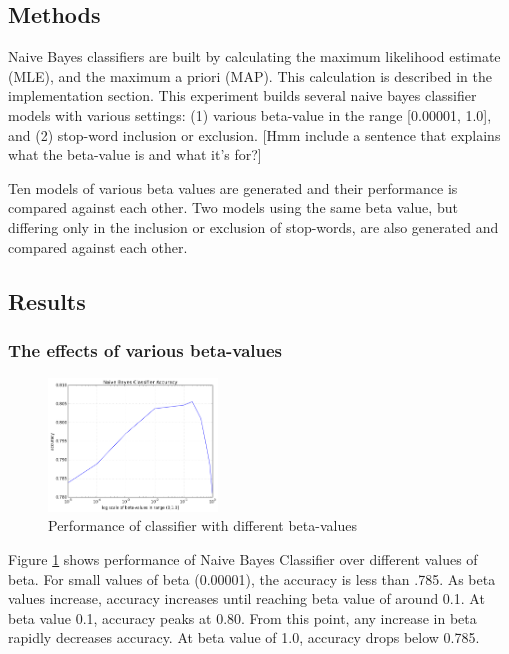 \documentclass{IEEEtran}
\begin{document}
\subsection{Methods}
Naive Bayes classifiers are built by calculating the maximum likelihood estimate (MLE), and the maximum a priori (MAP). This calculation is described in the implementation section. This experiment builds several naive bayes classifier models with various settings: (1) various beta-value in the range [0.00001, 1.0], and (2) stop-word inclusion or exclusion. [Hmm include a sentence that explains what the beta-value is and what it's for?]

Ten models of various beta values are generated and their performance is compared against each other. Two models using the same beta value, but differing only in the inclusion or exclusion of stop-words, are also generated and compared against each other.

\subsection{Results}
\subsubsection{The effects of various beta-values}

\begin{figure}
  \includegraphics[width=0.4\textwidth, natwidth=80,natheight=80]{betavsacc.png}
  \caption{Performance of classifier with different beta-values}
  \label{fig:betavsacc}
\end{figure}

Figure \ref{fig:betavsacc} shows performance of Naive Bayes Classifier over different values of beta. For small values of beta (0.00001), the accuracy is less than .785. As beta values increase, accuracy increases until reaching beta value of around 0.1. At beta value 0.1, accuracy peaks at 0.80. From this point, any increase in beta rapidly decreases accuracy. At beta value of 1.0, accuracy drops below 0.785.
\end{document}
